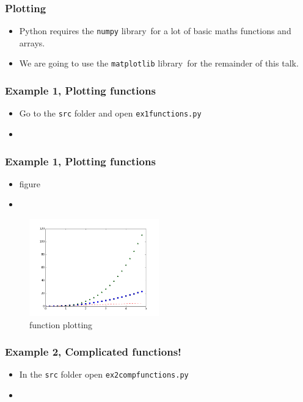 \documentclass{beamer}
\begin{document}
\begin{frame}
\frametitle{Plotting}
\begin{itemize}
	\item Python requires the \texttt{numpy} library\footnotemark\ for a lot of basic maths functions and arrays.
	\item We are going to use the \texttt{matplotlib} library\footnotemark\ for the remainder of this talk. 
\end{itemize}
\end{frame}

\begin{frame}
\frametitle{Example 1, Plotting functions}
\begin{itemize}
	\item Go to the \texttt{src} folder and open \texttt{ex1functions.py} 
	\item  
\end{itemize}
\end{frame}

\begin{frame}
\frametitle{Example 1, Plotting functions}
\begin{itemize}
	\item figure 
	\item  
\end{itemize}
\begin{figure}
	\centering
	\includegraphics[width=0.5\textwidth]{ex1.png}
	\caption{function plotting}
	\label{fig:function}
\end{figure}
\end{frame}

\begin{frame}
\frametitle{Example 2, Complicated functions!}
\begin{itemize}
\item In the \texttt{src} folder open \texttt{ex2compfunctions.py} 
\item
\end{itemize}
\end{frame}
\end{document}
